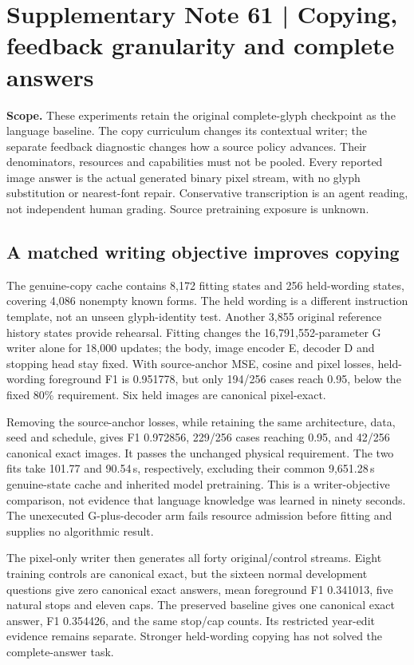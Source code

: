 \clearpage
\section*{Supplementary Note 61 | Copying, feedback granularity and complete answers}

\textbf{Scope.}
These experiments retain the original complete-glyph checkpoint as the
language baseline. The copy curriculum changes its contextual writer; the
separate feedback diagnostic changes how a source policy advances. Their
denominators, resources and capabilities must not be pooled. Every reported
image answer is the actual generated binary pixel stream, with no glyph
substitution or nearest-font repair. Conservative transcription is an agent
reading, not independent human grading. Source pretraining exposure is unknown.

\subsection*{A matched writing objective improves copying}
The genuine-copy cache contains 8,172 fitting states and 256 held-wording states,
covering 4,086 nonempty known forms. The held wording is a different instruction
template, not an unseen glyph-identity test. Another 3,855 original reference
history states provide rehearsal. Fitting changes the 16,791,552-parameter G
writer alone for 18,000 updates; the body, image encoder E, decoder D and
stopping head stay fixed. With source-anchor MSE, cosine and pixel losses,
held-wording foreground F1 is 0.951778, but only 194/256 cases reach 0.95,
below the fixed 80\% requirement. Six held images are canonical pixel-exact.

Removing the source-anchor losses, while retaining the same architecture,
data, seed and schedule, gives F1 0.972856, 229/256 cases reaching 0.95, and
42/256 canonical exact images. It passes the unchanged physical requirement.
The two fits take 101.77 and 90.54\,s, respectively, excluding their common
9,651.28\,s genuine-state cache and inherited model pretraining. This is a
writer-objective comparison, not evidence that language knowledge was learned
in ninety seconds. The unexecuted G-plus-decoder arm fails resource admission
before fitting and supplies no algorithmic result.

The pixel-only writer then generates all forty original/control streams.
Eight training controls are canonical exact, but the sixteen normal development
questions give zero canonical exact answers, mean foreground F1 0.341013,
five natural stops and eleven caps. The preserved baseline gives one canonical
exact answer, F1 0.354426, and the same stop/cap counts. Its restricted year-edit
evidence remains separate. Stronger held-wording copying has not solved the
complete-answer task.

